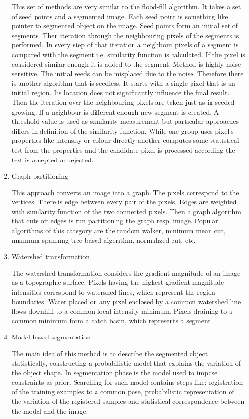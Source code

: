 \begin{enumerate}
  This set of methods are very similar to the flood-fill algorithm.
It takes a set of seed points and a segmented image.
Each seed point is something like pointer to segmented object on the image.
Seed points form an initial set of segments.
Then iteration through the neighbouring pixels of the segments is performed.
In every step of that iteration a neighbour pixels of a segment is compared with the segment i.e. similarity function is calculated.
If the pixel is considered similar enough it is added to the segment.
Method is highly noise-sensitive.
The initial seeds can be misplaced due to the noise.
Therefore there is another algorithm that is seedless.
It starts with a single pixel that is an initial region.
Its location does not significantly influence the final result.
Then the iteration over the neighbouring pixels are taken just as in seeded growing.
If a neighbour is different enough new segment is created.
A threshold value is used as similarity measurement but particular approaches differs in definition of the similarity function.
While one group uses pixel's properties like intensity or colour directly another computes some statistical test from the properties and the candidate pixel is processed according the test is accepted or rejected.

  \item Graph partitioning

This approach converts an image into a graph.
The pixels correspond to the vertices.
There is edge between every pair of the pixels.
Edges are weighted with similarity function of the two connected pixels.
Then a graph algorithm that cuts off edges is run partitioning the graph resp. image.
Popular algorithms of this category are the random walker, minimum mean cut, minimum spanning tree-based algorithm, normalized cut, etc.

  \item Watershed transformation

  The watershed transformation considers the gradient magnitude of an image as a topographic surface.
Pixels having the highest gradient magnitude intensities correspond to watershed lines, which represent the region boundaries.
Water placed on any pixel enclosed by a common watershed line flows downhill to a common local intensity minimum.
Pixels draining to a common minimum form a catch basin, which represents a segment.

  \item Model based segmentation

  The main idea of this method is to describe the segmented object statistically, constructing a probabilistic model that explains the variation of the object shape.
In segmentation phase is the model used to impose constraints as prior.
Searching for such model contains steps like: registration of the training examples to a common pose, probabilistic representation of the variation of the registered samples and statistical correspondence between the model and the image.


\end{enumerate}
